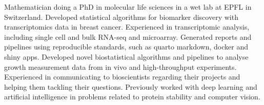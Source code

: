 

\begin{cvparagraph}

Mathematician doing a PhD in molecular life sciences in a wet lab at EPFL in Switzerland. 
Developed statistical algorithms for biomarker discovery with transcriptomics
data in breast cancer. 
Experienced in transcriptomic analysis, including single cell and bulk RNA-seq
and microarray. Generated reports and pipelines using
reproducible standards, such as quarto markdown, docker and shiny apps. 
Developed novel biostatistical algorithms and
pipelines to analyse growth measurement data from in vivo and 
high-throughput experiments. Experienced in communicating to 
bioscientists regarding their projects and helping them tackling their questions.
Previously worked with deep learning and artificial intelligence in problems related
to protein stability and computer vision.

\end{cvparagraph}
